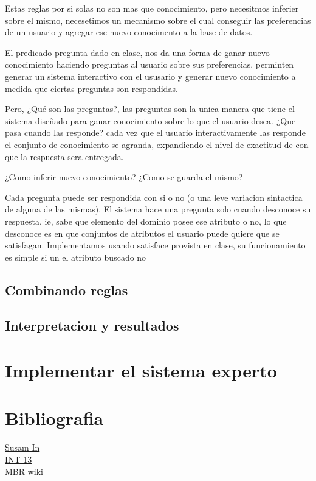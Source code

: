 \documentclass[11pt,oneside,a4paper]{article}
\begin{document}
\inputminted[firstline=1, lastline=13, fontsize=\footnotesize]{perl}{tp-prolog.pl}

Estas reglas por si solas no son mas que conocimiento, pero necesitmos inferier 
sobre el mismo, necesetimos un mecanismo sobre el cual conseguir las preferencias 
de un usuario y agregar ese nuevo conocimento a la base de datos.


El predicado pregunta dado en clase, nos da una forma de ganar nuevo conocimiento
haciendo preguntas al usuario sobre sus preferencias.
perminten generar un sistema interactivo con el ususario y generar nuevo
conocimiento a medida que ciertas preguntas son respondidas.

Pero, ¿Qué son las 
preguntas?, las preguntas son la unica manera que tiene el sistema diseñado 
para ganar conocimiento sobre lo que el usuario desea. ¿Que pasa cuando las responde?
cada vez que el usuario interactivamente las responde el 
conjunto de conocimiento se agranda, expandiendo el nivel de exactitud  %
de con que la respuesta sera entregada.


¿Como inferir nuevo conocimiento? ¿Como se guarda el mismo?

Cada pregunta puede ser respondida con si o no (o una leve variacion 
sintactica de alguna de las mismas). El sistema hace una pregunta 
solo cuando desconoce su respuesta, ie, sabe que elemento del dominio 
posee ese atributo o no, lo que desconoce es en que conjuntos de atributos 
el usuario puede quiere que se satisfagan. 
Implementamos usando satisface  %
provista en clase, su funcionamiento es simple si un el atributo buscado
no 

\subsection{Combinando reglas}



\subsection{Interpretacion y resultados}

\section{Implementar el sistema experto}

\section*{Bibliografia}


\href{http://susam.in/articles/boot-sector-code/}{Susam In}\\
\href{http://www.pelletiernet.com/helppc/int_13-2.html}{INT 13}\\
\href{http://en.wikipedia.org/wiki/Master_boot_record}{MBR wiki}
\end{document}
